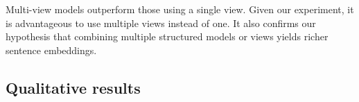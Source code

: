 Multi-view models outperform those using a single view. Given our experiment, it is advantageous to use multiple views instead of one. It also confirms our hypothesis that combining multiple structured models or views yields richer sentence embeddings.

\begin{table}[!htb]
\footnotesize
\caption{Impact of the multi-view. The first section corresponds to single-view setups for which $f$ and $g$ are the same views. The second section reports multi-view models. For each model, we report the average score on the SentEval benchmark.}
\end{table}

\subsection{Qualitative results}

